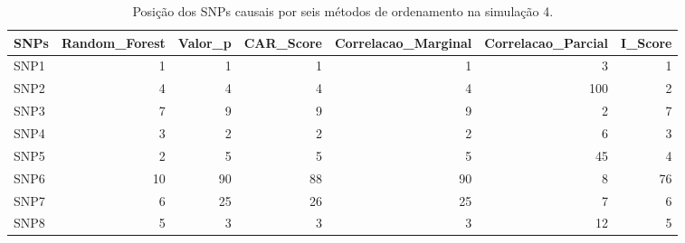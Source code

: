 \begin{table}[ht]
\centering
\begin{tabular}{lrrrrrr}
  \hline
SNPs & Random\_Forest & Valor\_p & CAR\_Score & Correlacao\_Marginal & Correlacao\_Parcial & I\_Score \\ 
  \hline
SNP1 &   1 &   1 &   1 &   1 &   3 &   1 \\ 
  SNP2 &   4 &   4 &   4 &   4 & 100 &   2 \\ 
  SNP3 &   7 &   9 &   9 &   9 &   2 &   7 \\ 
  SNP4 &   3 &   2 &   2 &   2 &   6 &   3 \\ 
  SNP5 &   2 &   5 &   5 &   5 &  45 &   4 \\ 
  SNP6 &  10 &  90 &  88 &  90 &   8 &  76 \\ 
  SNP7 &   6 &  25 &  26 &  25 &   7 &   6 \\ 
  SNP8 &   5 &   3 &   3 &   3 &  12 &   5 \\ 
   \hline
\end{tabular}
\caption{Posição dos SNPs causais por seis métodos de ordenamento na simulação 4.} 
\label{tab:positions_causais}
\end{table}
